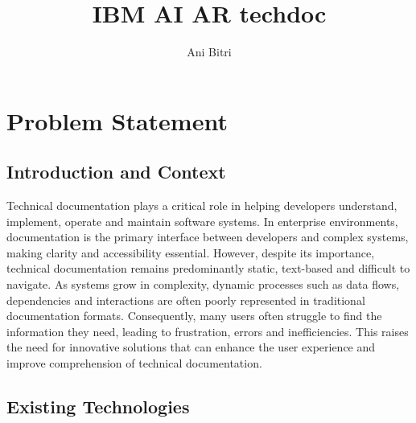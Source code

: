 \documentclass[12pt]{article}
\title{IBM AI AR techdoc}
\author{Ani Bitri}
\begin{document}
\maketitle

\tableofcontents
\newpage

\section{Problem Statement}

    \subsection{Introduction and Context}

        Technical documentation plays a critical role in helping developers understand, implement, operate and maintain software systems. In enterprise environments, documentation is the primary interface between developers and complex
        systems, making clarity and accessibility essential. However, despite its importance, technical documentation remains predominantly static, text-based and difficult to navigate. As systems grow in complexity, dynamic processes such
        as data flows, dependencies and interactions are often poorly represented in traditional documentation formats. Consequently, many users often struggle to find the information they need, leading to frustration, errors and inefficiencies. This 
        raises the need for innovative solutions that can enhance the user experience and improve comprehension of technical documentation.

    \subsection{Existing Technologies}
\end{document}
